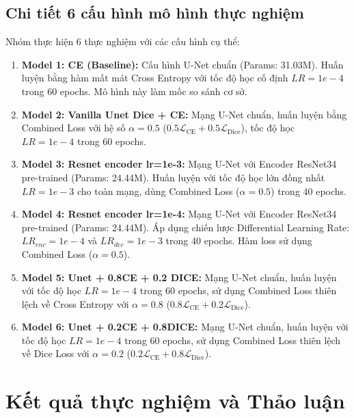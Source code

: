 \documentclass[a4paper,12pt]{report}
\begin{document}
\section{Chi tiết 6 cấu hình mô hình thực nghiệm}
Nhóm thực hiện 6 thực nghiệm với các cấu hình cụ thể:
\begin{enumerate}
    \item \textbf{Model 1: CE (Baseline):} Cấu hình U-Net chuẩn (Params: 31.03M). Huấn luyện bằng hàm mất mát Cross Entropy với tốc độ học cố định $LR = 1e-4$ trong 60 epochs. Mô hình này làm mốc so sánh cơ sở.
    
    \item \textbf{Model 2: Vanilla Unet Dice + CE:} Mạng U-Net chuẩn, huấn luyện bằng Combined Loss với hệ số $\alpha = 0.5$ ($0.5\mathcal{L}_{\text{CE}} + 0.5\mathcal{L}_{\text{Dice}}$), tốc độ học $LR = 1e-4$ trong 60 epochs.
    
    \item \textbf{Model 3: Resnet encoder lr=1e-3:} Mạng U-Net với Encoder ResNet34 pre-trained (Params: 24.44M). Huấn luyện với tốc độ học lớn đồng nhất $LR = 1e-3$ cho toàn mạng, dùng Combined Loss ($\alpha=0.5$) trong 40 epochs.
    
    \item \textbf{Model 4: Resnet encoder lr=1e-4:} Mạng U-Net với Encoder ResNet34 pre-trained (Params: 24.44M). Áp dụng chiến lược Differential Learning Rate: $LR_{enc} = 1e-4$ và $LR_{dec} = 1e-3$ trong 40 epochs. Hàm loss sử dụng Combined Loss ($\alpha=0.5$).
    
    \item \textbf{Model 5: Unet + 0.8CE + 0.2 DICE:} Mạng U-Net chuẩn, huấn luyện với tốc độ học $LR=1e-4$ trong 60 epochs, sử dụng Combined Loss thiên lệch về Cross Entropy với $\alpha = 0.8$ ($0.8\mathcal{L}_{\text{CE}} + 0.2\mathcal{L}_{\text{Dice}}$).
    
    \item \textbf{Model 6: Unet + 0.2CE + 0.8DICE:} Mạng U-Net chuẩn, huấn luyện với tốc độ học $LR=1e-4$ trong 60 epochs, sử dụng Combined Loss thiên lệch về Dice Loss với $\alpha = 0.2$ ($0.2\mathcal{L}_{\text{CE}} + 0.8\mathcal{L}_{\text{Dice}}$).
\end{enumerate}

\newpage

\chapter{Kết quả thực nghiệm và Thảo luận}
\end{document}
